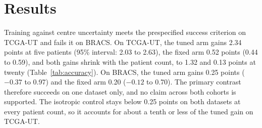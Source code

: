 \section{Results}
\label{sec:results}
Training against centre uncertainty meets the prespecified success criterion on TCGA-UT and fails it on BRACS. On TCGA-UT, the tuned arm gains 2.34 points at five patients (95\% interval: 2.03 to 2.63), the fixed arm 0.52 points (0.44 to 0.59), and both gains shrink with the patient count, to 1.32 and 0.13 points at twenty (Table~\ref{tab:accuracy}). On BRACS, the tuned arm gains 0.25 points ($-0.37$ to 0.97) and the fixed arm 0.20 ($-0.12$ to 0.70). The primary contrast therefore succeeds on one dataset only, and no claim across both cohorts is supported. The isotropic control stays below 0.25 points on both datasets at every patient count, so it accounts for about a tenth or less of the tuned gain on TCGA-UT.

